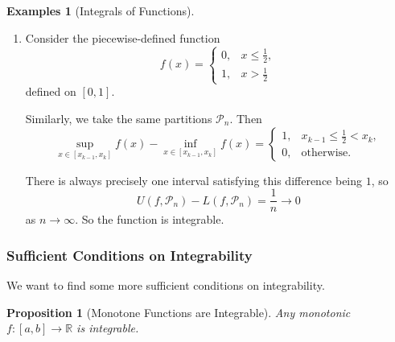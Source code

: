 \documentclass[11pt]{article}
\numberwithin{equation}{section}
\newtheorem{proposition}[theorem]{Proposition}
\theoremstyle{definition}
\newtheorem{examples}[theorem]{Examples}
\theoremstyle{remark}
\newcommand{\pqty}[1]{\left(#1\right)}
\newcommand{\ccintv}[2]{[#1,#2]}
\newcommand{\functiondomain}[3]{#1:#2\to #3}
\newcommand{\RR}{\mathbb R}
\newcommand{\partition}{\mathcal P}
\newcommand{\upperSum}{U}
\newcommand{\lowerSum}{L}
\newcommand{\upperI}{\overline I}
\newcommand{\lowerI}{\underline I}
\begin{document}
\begin{examples}[Integrals of Functions]
\begin{enumerate}
        But by \autoref{cor:upper-greater-lower-int}, we have
        \[
            \frac{1}{2} \leq \lowerI\pqty{f} \leq \upperI\pqty{f} \leq \frac{1}{2}
        \]
        and hence
        \[
            \lowerI\pqty{f} = \upperI\pqty{f} = \frac{1}{2}
        \]
        so \(\int_{0}^{1} f\pqty{x} \dd{x} = \frac{1}{2}\).

        With \autoref{prop:sequential-riemann-integrability-criteria} (Sequential Riemann Integrability Criteria), we note
        \[
            \upperSum\pqty{f, \partition_{n}} - \lowerSum\pqty{f, \partition_{n}} = \frac{1}{n} \to 0
        \]
        as \(n \to \infty\). So this function is integrable.

        \item Consider the piecewise-defined function
        \[
            f\pqty{x} = \begin{cases}
                0, & x \leq \frac{1}{2}, \\
                1, & x > \frac{1}{2}
            \end{cases}
        \]
        defined on \(\ccintv{0}{1}\).

        Similarly, we take the same partitions \(\partition_n\). Then
        \[
            \sup_{x \in \ccintv{x_{k - 1}}{x_k}} f\pqty{x} - \inf_{x \in \ccintv{x_{k - 1}}{x_k}} f\pqty{x} = \begin{cases}
                1, & x_{k - 1} \leq \frac{1}{2} < x_k,\\
                0, & \text{otherwise}.
            \end{cases}
        \]

        There is always precisely one interval satisfying this difference being \(1\), so
        \[
            \upperSum\pqty{f, \partition_n} - \lowerSum\pqty{f, \partition_n} = \frac{1}{n} \to 0
        \]
        as \(n \to \infty\). So the function is integrable.
    \end{enumerate}
\end{examples}

\subsubsection{Sufficient Conditions on Integrability}

We want to find some more sufficient conditions on integrability.

\begin{proposition}[Monotone Functions are Integrable]\label{analysis-unit-0150}
    \label{prop:monotonic-integrable}%
    Any monotonic \(\functiondomain{f}{\ccintv{a}{b}}{\RR}\) is integrable.
\end{proposition}
\end{document}
